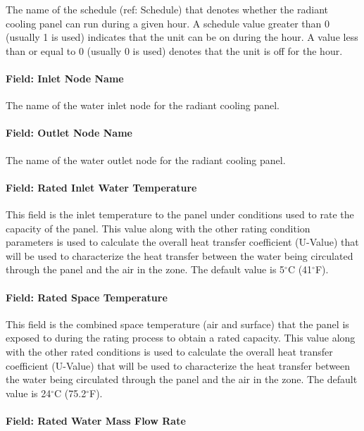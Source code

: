 The name of the schedule (ref: Schedule) that denotes whether the radiant cooling panel can run during a given hour. A schedule value greater than 0 (usually 1 is used) indicates that the unit can be on during the hour. A value less than or equal to 0 (usually 0 is used) denotes that the unit is off for the hour.

\paragraph{Field: Inlet Node Name}\label{field-inlet-node-name-2-002-1}

The name of the water inlet node for the radiant cooling panel.

\paragraph{Field: Outlet Node Name}\label{field-outlet-node-name-2-002-1}

The name of the water outlet node for the radiant cooling panel.

\paragraph{Field: Rated Inlet Water Temperature}

This field is the inlet temperature to the panel under conditions used to rate the capacity of the panel.  This value along with the other rating condition parameters is used to calculate the overall heat transfer coefficient (U-Value) that will be used to characterize the heat transfer between the water being circulated through the panel and the air in the zone.  The default value is 5$^\circ$C (41$^\circ$F).

\paragraph{Field: Rated Space Temperature}\label{field-rated-space-temperature}

This field is the combined space temperature (air and surface) that the panel is exposed to during the rating process to obtain a rated capacity.  This value along with the other rated conditions is used to calculate the overall heat transfer coefficient (U-Value) that will be used to characterize the heat transfer between the water being circulated through the panel and the air in the zone.  The default value is 24$^\circ$C (75.2$^\circ$F).

\paragraph{Field: Rated Water Mass Flow Rate}\label{field-rated-water-mass-flow-rate}

